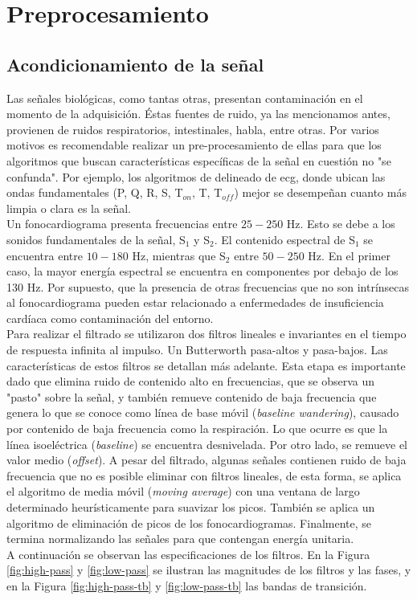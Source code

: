 \chapter{Preprocesamiento}

\section{Acondicionamiento de la señal}

Las señales biológicas, como tantas otras, presentan contaminación en el momento de la adquisición. Éstas fuentes de
ruido, ya las mencionamos antes, provienen de ruidos respiratorios, intestinales, habla, entre otras. Por varios
motivos es recomendable realizar un pre-procesamiento de ellas para que los algoritmos que buscan características
específicas de la señal en cuestión no "se confunda". Por ejemplo, los algoritmos de delineado de \acrshort{ecg},
donde ubican las ondas fundamentales (P, Q, R, S, T$_{on}$, T, T$_{off}$) mejor se desempeñan cuanto más limpia o
clara es la señal. \\
\indent Un fonocardiograma presenta frecuencias entre $25-250$ Hz. Esto se debe a los sonidos fundamentales de la
señal, S$_1$ y S$_2$. El contenido espectral de S$_1$ se encuentra entre $10-180$ Hz, mientras que S$_2$ entre
$50-250$ Hz. En el primer caso, la mayor energía espectral se encuentra en componentes por debajo de los 130 Hz. Por
supuesto, que la presencia de otras frecuencias que no son intrínsecas al fonocardiograma pueden estar relacionado a
enfermedades de insuficiencia cardíaca como contaminación del entorno. \\
\indent Para realizar el filtrado se utilizaron dos filtros lineales e invariantes en el tiempo de respuesta
infinita al impulso. Un Butterworth pasa-altos y pasa-bajos. Las características de estos filtros se detallan más
adelante. Esta etapa es importante dado que elimina ruido de contenido alto en frecuencias, que se observa un
"pasto" sobre la señal, y también remueve contenido de baja frecuencia que genera lo que se conoce como línea de
base móvil (\textit{baseline wandering}), causado por contenido de baja frecuencia como la respiración. Lo que
ocurre es que la línea isoeléctrica (\textit{baseline}) se encuentra desnivelada. Por otro lado, se remueve el valor
medio (\textit{offset}). A pesar del filtrado, algunas señales contienen ruido de baja frecuencia que no es posible
eliminar con filtros lineales, de esta forma, se aplica el algoritmo de media móvil (\textit{moving average}) con
una ventana de largo determinado heurísticamente para suavizar los picos. También se aplica un algoritmo de
eliminación de picos de los fonocardiogramas. Finalmente, se termina normalizando las señales para que contengan
energía unitaria. \\
\indent A continuación se observan las especificaciones de los filtros. En la Figura \ref{fig:high-pass}
y \ref{fig:low-pass} se ilustran las magnitudes de los filtros y las fases, y en la Figura \ref{fig:high-pass-tb}
y \ref{fig:low-pass-tb} las bandas de transición.


